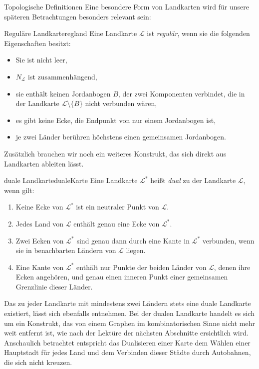 \begin{section}{Topologische Definitionen}
 Eine besondere Form von Landkarten wird für unsere späteren Betrachtungen besonders relevant sein:
 
 \begin{definitionl}{Reguläre Landkarte}{regland}
  Eine Landkarte $\mathcal{L}$ ist \textit{regulär}, wenn sie die folgenden Eigenschaften besitzt:
  \begin{itemize}
   \item Sie ist nicht leer,
   \item $N_{\mathcal{L}}$ ist zusammenhängend,
   \item sie enthält keinen Jordanbogen $B$, der zwei Komponenten verbindet, die in der Landkarte $\mathcal{L} \setminus \{B\}$ nicht verbunden wären,
   \item es gibt keine Ecke, die Endpunkt von nur einem Jordanbogen ist,
   \item je zwei Länder berühren höchstens einen gemeinsamen Jordanbogen.
  \end{itemize}
 \end{definitionl}
 
 Zusätzlich brauchen wir noch ein weiteres Konstrukt, das sich direkt aus Landkarten ableiten lässt.

 \begin{definitionl}{duale Landkarte}{dualeKarte}
  Eine Landkarte $\mathcal{L}^*$ heißt \textit{dual} zu der Landkarte $\mathcal{L}$, wenn gilt:
  \begin{enumerate}
   \item Keine Ecke von $\mathcal{L}^*$ ist ein neutraler Punkt von $\mathcal{L}$.
   \item Jedes Land von $\mathcal{L}$ enthält genau eine Ecke von $\mathcal{L}^*$.
   \item Zwei Ecken von $\mathcal{L}^*$ sind genau dann durch eine Kante in $\mathcal{L}^*$ verbunden, wenn sie in benachbarten Ländern von $\mathcal{L}$ liegen.
   \item Eine Kante von $\mathcal{L}^*$ enthält nur Punkte der beiden Länder von $\mathcal{L}$, denen ihre Ecken angehören, und genau einen inneren Punkt einer gemeinsamen Grenzlinie dieser Länder.
  \end{enumerate}
 \end{definitionl}
 
 Das zu jeder Landkarte mit mindestens zwei Ländern stets eine duale Landkarte existiert, lässt sich ebenfalls \cite{fritsch} entnehmen. Bei der dualen Landkarte handelt es sich um ein Konstrukt, das von einem Graphen im kombinatorischen Sinne nicht mehr weit entfernt ist, wie nach der Lektüre der nächsten Abschnitte ersichtlich wird. Anschaulich betrachtet entspricht das Dualisieren einer Karte dem Wählen einer Hauptstadt für jedes Land und dem Verbinden dieser Städte durch Autobahnen, die sich nicht kreuzen.
 

\end{section}
